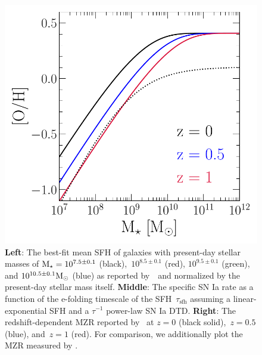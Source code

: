\documentclass[ms.tex]{subfiles}
\begin{document}
\begin{figure}
\includegraphics[scale = 0.42]{mzr.pdf}
\caption{
\textbf{Left}: The best-fit mean SFH of galaxies with present-day stellar
masses of $\text{M}_\star = 10^{7.5 \pm 0.1}$ (black),~$10^{8.5 \pm 0.1}$ (red),
$10^{9.5 \pm 0.1}$ (green), and $10^{10.5 \pm 0.1} \text{M}_\odot$ (blue) as reported
by~\um~and normalized by the present-day stellar mass itself.
\textbf{Middle}: The specific SN Ia rate as a function of the e-folding
timescale of the SFH~$\tau_\text{sfh}$ assuming a linear-exponential SFH and a
$\tau^{-1}$ power-law SN Ia DTD.
\textbf{Right}: The redshift-dependent MZR reported by~\citet{Zahid2014} at
$z = 0$ (black solid),~$z = 0.5$ (blue), and~$z = 1$ (red).
For comparison, we additionally plot the MZR measured by
\citet[][black dotted, appropriate for~$z = 0$]{Andrews2013}.
}
\label{fig:sfh_mzr}
\end{figure}
\end{document}
